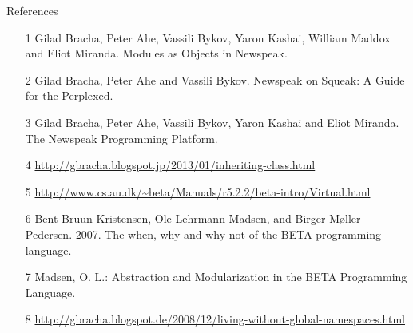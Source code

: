 \documentclass[xcolor=dvipsname, handout]{beamer} %
\begin{document}
\begin{frame}{References}
\footnotesize
\begin{itemize}
  \item [1] Gilad Bracha, Peter Ahe, Vassili Bykov, Yaron Kashai, William Maddox and Eliot Miranda. Modules as Objects in Newspeak.
  \item [2] Gilad Bracha, Peter Ahe and Vassili Bykov. Newspeak on Squeak: A Guide for the Perplexed.
  \item [3] Gilad Bracha, Peter Ahe, Vassili Bykov, Yaron Kashai and Eliot Miranda. The Newspeak Programming Platform. 
  \item [4] \url{http://gbracha.blogspot.jp/2013/01/inheriting-class.html}
  \item [5] \url{http://www.cs.au.dk/~beta/Manuals/r5.2.2/beta-intro/Virtual.html}
  \item [6] Bent Bruun Kristensen, Ole Lehrmann Madsen, and Birger Møller-Pedersen. 2007. The when, why and why not of the BETA programming language.
  \item [7]  Madsen, O. L.: Abstraction and Modularization in the BETA Programming Language.
  \item [8] \url{http://gbracha.blogspot.de/2008/12/living-without-global-namespaces.html}
\end{itemize}
\end{frame}
\end{document}
